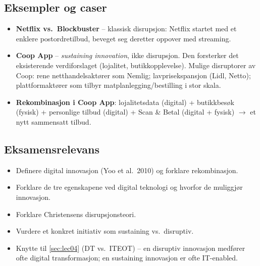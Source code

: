 \subsection{Eksempler og caser}
\begin{itemize}
  \item \textbf{Netflix vs.\ Blockbuster} -- klassisk disrupsjon: Netflix
    startet med et enklere postordretilbud, beveget seg deretter oppover
    med streaming.
  \item \textbf{Coop App} -- \emph{sustaining innovation}, ikke disrupsjon.
    Den forsterker det eksisterende verdiforslaget (lojalitet,
    butikkopplevelse). Mulige disruptorer av Coop: rene
    netthandelsaktører som Nemlig; lavprisekspansjon (Lidl, Netto);
    plattformaktører som tilbyr matplanlegging/bestilling i stor skala.
  \item \textbf{Rekombinasjon i Coop App}: lojalitetsdata (digital) +
    butikkbesøk (fysisk) + personlige tilbud (digital) + Scan \& Betal
    (digital + fysisk) $\rightarrow$ et nytt sammensatt tilbud.
\end{itemize}

\subsection{Eksamensrelevans}
\begin{itemize}
  \item Definere digital innovasjon (Yoo et al.\ 2010) og forklare
    rekombinasjon.
  \item Forklare de tre egenskapene ved digital teknologi og hvorfor de
    muliggjør innovasjon.
  \item Forklare Christensens disrupsjonsteori.
  \item Vurdere et konkret initiativ som sustaining vs.\ disruptiv.
  \item Knytte til \autoref{sec:lec04} (DT vs.\ ITEOT) -- en disruptiv
    innovasjon medfører ofte digital transformasjon; en sustaining
    innovasjon er ofte IT-enabled.
\end{itemize}
